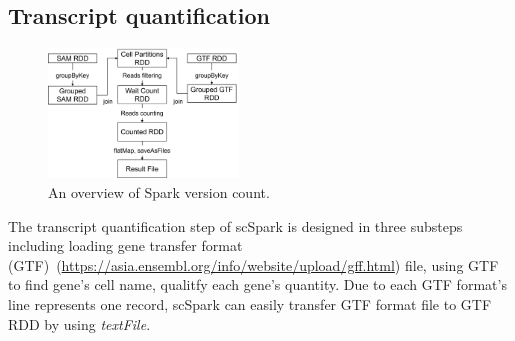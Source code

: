 \documentclass[conference]{IEEEtran}
\begin{document}

\subsection{Transcript quantification}
\begin{figure}
\centering
	\includegraphics[width=0.45\textwidth]{figure3.png}
	\caption{An overview of Spark version count.} \label{fig3}
\end{figure}

The transcript quantification step of scSpark is designed in three substeps including loading gene transfer format (GTF)~(\url{https://asia.ensembl.org/info/website/upload/gff.html}) file, using GTF to find gene's cell name, qualitfy each gene's quantity.
Due to each GTF format's line represents one record, scSpark can easily transfer GTF format file to GTF RDD by using \textit{textFile}.
\end{document}
